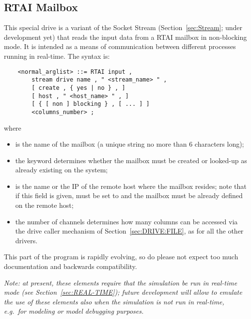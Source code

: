 \subsection{RTAI Mailbox}\label{sec:RTAI_in}
This special drive is a variant of the Socket Stream
(Section~\ref{sec:Stream}; under development yet)
that reads the input data from a RTAI mailbox in non-blocking mode.
It is intended as a means of communication between different processes
running in real-time.
The syntax is:
\begin{verbatim}
    <normal_arglist> ::= RTAI input ,
        stream drive name , " <stream_name> " ,
        [ create , { yes | no } , ]
        [ host , " <host_name> " , ]
        [ { [ non ] blocking } , [ ... ] ]
        <columns_number> ;
\end{verbatim}
where
\begin{itemize}
\item {} is the name of the mailbox (a unique string 
no more than 6 characters long);
\item the  keyword determines whether the mailbox 
must be created or looked-up as already existing on the system;
\item {} is the name or the IP of the remote host where 
the mailbox resides; note that if this field is given,  must
be set to  and the mailbox must be already defined
on the remote host;
\item the number of channels  determines how many
columns can be accessed via the  drive caller mechanism 
of Section~\ref{sec:DRIVE:FILE}, as for all the other  drivers.
\end{itemize}
This part of the program is rapidly evolving, so do please not expect
too much documentation and backwards compatibility.

\emph{Note: at present, these elements require that the simulation
be run in real-time mode (see Section~\ref{sec:REAL-TIME});
future development will allow to emulate the use of these elements
also when the simulation is not run in real-time, e.g.\ for modeling
or model debugging purposes.}



